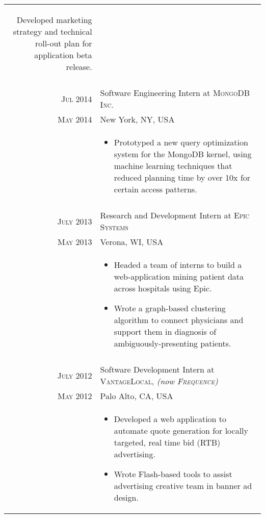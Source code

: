 \documentclass[a4paper,10pt]{article}
\begin{document}
\begin{longtable}{r|p{11cm}}
{\begin{itemize}
{			Developed marketing strategy and technical roll-out plan for application
			beta release.
		}
	\end{itemize}
   }\\
 \multicolumn{2}{c}{} \\
 \nopagebreak \textsc{Jul 2014} & Software Engineering Intern at \textsc{MongoDB Inc.}\\
 \nopagebreak \textsc{May 2014} & \small{New York, NY, USA} \\
 \nopagebreak	& \footnotesize{
	\begin{itemize}
		\item[]{
			Prototyped a new query optimization system for the MongoDB kernel,
			using machine learning techniques that reduced planning time by over 10x
			for certain access patterns.
		}
	\end{itemize}
   }\\
 \multicolumn{2}{c}{} \\
 \nopagebreak \textsc{July 2013} & Research and Development Intern at \textsc{Epic Systems}\\
 \nopagebreak \textsc{May 2013} & \small{Verona, WI, USA} \\
 \nopagebreak	& \footnotesize{
	\begin{itemize}
		\item[]{
			Headed a team of interns to build a web-application mining patient
			 data across hospitals using Epic.
		}
		\item[]{
			Wrote a graph-based clustering algorithm to  connect physicians and
			support them in diagnosis of ambiguously-presenting patients.
		}
	\end{itemize}
   }\\
 \multicolumn{2}{c}{} \\
 \nopagebreak \textsc{July 2012} & Software Development Intern at \textsc{VantageLocal}, \small\emph{(now \textsc{Frequence})}\\
 \nopagebreak \textsc{May 2012} & \small{Palo Alto, CA, USA}\\
 \nopagebreak & \footnotesize{
	\begin{itemize}
		\item[]{
			Developed a web application to automate quote generation for
			locally targeted, real time bid (RTB) advertising.
		}
		\item[]{
			Wrote Flash-based tools to assist advertising creative team
			in banner ad design.
		}
	\end{itemize}
   }\\

\end{longtable}
\end{document}
